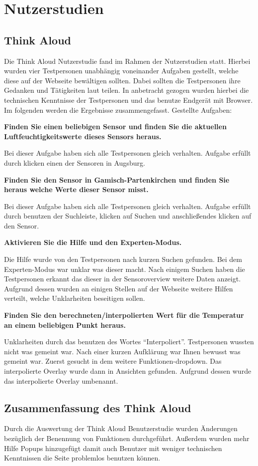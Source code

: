 \section{Nutzerstudien}
\subsection{Think Aloud}
Die Think Aloud Nutzerstudie fand im Rahmen der Nutzerstudien statt. Hierbei wurden vier Testpersonen unabhängig voneinander Aufgaben gestellt,
welche diese auf der Webseite bewältigen sollten. Dabei sollten die Testpersonen ihre Gedanken und Tätigkeiten laut teilen.
In anbetracht gezogen wurden hierbei die technischen Kenntnisse der Testpersonen und das benutze Endgerät mit Browser. Im folgenden werden die Ergebnisse zusammengefasst.
Gestellte Aufgaben:

\textbf{Finden Sie einen beliebigen Sensor und finden Sie die aktuellen Luftfeuchtigkeitswerte dieses Sensors heraus.}

Bei dieser Aufgabe haben sich alle Testpersonen gleich verhalten. 
Aufgabe erfüllt durch klicken einen der Sensoren in Augsburg.

\textbf{Finden Sie den Sensor in Gamisch-Partenkirchen und finden Sie heraus welche Werte dieser Sensor misst.}

Bei dieser Aufgabe haben sich alle Testpersonen gleich verhalten. 
Aufgabe erfüllt durch benutzen der Suchleiste, klicken auf Suchen und anschließendes klicken auf den Sensor.

\textbf{Aktivieren Sie die Hilfe und den Experten-Modus.}

Die Hilfe wurde von den Testpersonen nach kurzen Suchen gefunden.
Bei dem Experten-Modus war unklar was dieser macht. Nach einigem Suchen haben die Testpersonen erkannt das dieser in der Sensoroverview weitere Daten anzeigt.
Aufgrund dessen wurden an einigen Stellen auf der Webseite weitere Hilfen verteilt, welche Unklarheiten beseitigen sollen. 

\textbf{Finden Sie den berechneten/interpolierten Wert für die Temperatur an einem beliebigen Punkt heraus.}

Unklarheiten durch das benutzen des Wortes \enquote{Interpoliert}. Testpersonen wussten nicht was gemeint war. Nach einer kurzen Aufklärung war Ihnen bewusst
was gemeint war. 
Zuerst gesucht in dem weitere Funktionen-dropdown. Das interpolierte Overlay wurde dann in Ansichten gefunden.
Aufgrund dessen wurde das interpolierte Overlay umbenannt. 

\subsection{Zusammenfassung des Think Aloud}
Durch die Auswertung der Think Aloud Benutzerstudie wurden Änderungen bezüglich der Benennung von Funktionen durchgeführt. Außerdem wurden mehr Hilfe Popups hinzugefügt damit auch Benutzer mit weniger
technischen Kenntnissen die Seite problemlos benutzen können.

